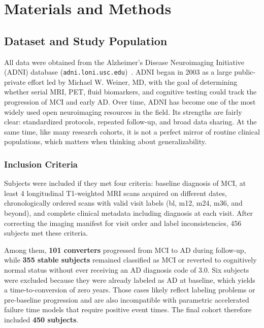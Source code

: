\documentclass[blue]{ludusofficial}  %
\begin{document}
\section{Materials and Methods}

\subsection{Dataset and Study Population}

All data were obtained from the Alzheimer's Disease Neuroimaging Initiative (ADNI) database (\texttt{adni.loni.usc.edu})~\cite{weiner2010adni,petersen2010adni}. ADNI began in 2003 as a large public-private effort led by Michael W. Weiner, MD, with the goal of determining whether serial MRI, PET, fluid biomarkers, and cognitive testing could track the progression of MCI and early AD. Over time, ADNI has become one of the most widely used open neuroimaging resources in the field. Its strengths are fairly clear: standardized protocols, repeated follow-up, and broad data sharing. At the same time, like many research cohorts, it is not a perfect mirror of routine clinical populations, which matters when thinking about generalizability.

\subsubsection{Inclusion Criteria}

Subjects were included if they met four criteria: baseline diagnosis of MCI, at least 4 longitudinal T1-weighted MRI scans acquired on different dates, chronologically ordered scans with valid visit labels (bl, m12, m24, m36, and beyond), and complete clinical metadata including diagnosis at each visit. After correcting the imaging manifest for visit order and label inconsistencies, 456 subjects met these criteria.

Among them, \textbf{101 converters} progressed from MCI to AD during follow-up, while \textbf{355 stable subjects} remained classified as MCI or reverted to cognitively normal status without ever receiving an AD diagnosis code of 3.0. Six subjects were excluded because they were already labeled as AD at baseline, which yields a time-to-conversion of zero years. Those cases likely reflect labeling problems or pre-baseline progression and are also incompatible with parametric accelerated failure time models that require positive event times. The final cohort therefore included \textbf{450 subjects}.
\end{document}
